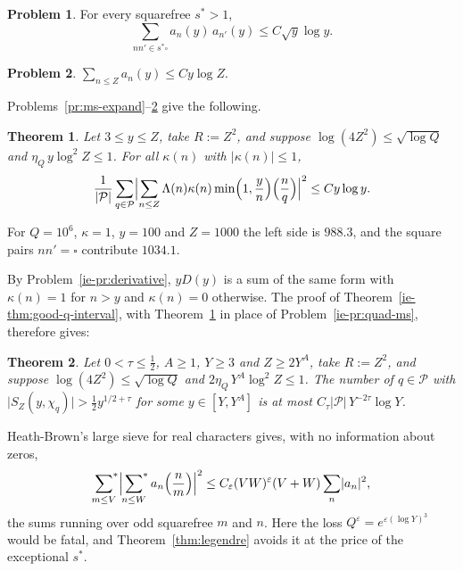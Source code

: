\documentclass[reqno]{amsart}
\theoremstyle{definition}
\newtheorem{problem}{Problem}[section]
\theoremstyle{plain}
\newtheorem{theorem}{Theorem}[section]
\newcommand{\Pc}{\mathcal{P}}
\newcommand{\leg}[2]{\Bigl(\frac{#1}{#2}\Bigr)}
\newcommand{\sq}{\square}
\begin{document}
\begin{problem}\label{pr:exc-pairs}
For every squarefree $s^* > 1$,
\[
  \sum_{n n' \in s^* \sq} a_n(y)\, a_{n'}(y) \le C \sqrt y \log y .
\]
\end{problem}

\begin{problem}\label{pr:l1}
$\sum_{n \le Z} a_n(y) \le C y \log Z$.
\end{problem}

Problems~\ref{pr:ms-expand}--\ref{pr:l1} give the following.

\begin{theorem}\label{thm:meansq}
Let $3 \le y \le Z$, take $R := Z^2$, and suppose $\log(4 Z^2) \le \sqrt{\log Q}$ and $\eta_Q\, y \log^2 Z \le 1$.  For all $\kappa(n)$ with $\lvert \kappa(n) \rvert \le 1$,
\[
  \frac{1}{\lvert \Pc \rvert} \sum_{q \in \Pc} \Bigl\lvert \sum_{n \le Z} \Lambda(n) \kappa(n) \min\Bigl(1, \frac yn\Bigr) \leg{n}{q} \Bigr\rvert^2 \le C y \log y .
\]
\end{theorem}

For $Q = 10^6$, $\kappa = 1$, $y = 100$ and $Z = 1000$ the left side is $988.3$, and the square pairs $n n' = \sq$ contribute $1034.1$.

By Problem~\ref{ie-pr:derivative}, $y D(y)$ is a sum of the same form with $\kappa(n) = 1$ for $n > y$ and $\kappa(n) = 0$ otherwise.  The proof of Theorem~\ref{ie-thm:good-q-interval}, with Theorem~\ref{thm:meansq} in place of Problem~\ref{ie-pr:quad-ms}, therefore gives:

\begin{theorem}\label{thm:window}
Let $0 < \tau \le \frac12$, $A \ge 1$, $Y \ge 3$ and $Z \ge 2Y^A$, take $R := Z^2$, and suppose $\log(4Z^2) \le \sqrt{\log Q}$ and $2\eta_Q\, Y^A \log^2 Z \le 1$.  The number of $q \in \Pc$ with $\lvert S_Z(y, \chi_q) \rvert > \frac12 y^{1/2 + \tau}$ for some $y \in [Y, Y^A]$ is at most $C_\tau \lvert \Pc \rvert\, Y^{-2\tau} \log Y$.
\end{theorem}

Heath-Brown's large sieve for real characters \cite[Thm.~1]{HB} gives, with no information about zeros,
\[
  \sideset{}{^*}\sum_{m \le V} \Bigl\lvert \sideset{}{^*}\sum_{n \le W} a_n \leg{n}{m} \Bigr\rvert^2 \le C_\varepsilon (VW)^\varepsilon (V + W) \sum_n \lvert a_n \rvert^2 ,
\]
the sums running over odd squarefree $m$ and $n$.  Here the loss $Q^\varepsilon = e^{\varepsilon (\log Y)^3}$ would be fatal, and Theorem~\ref{thm:legendre} avoids it at the price of the exceptional $s^*$.
\end{document}
